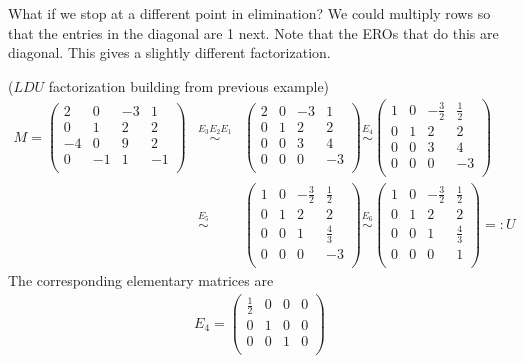 \newpage
What if we stop at a different point in elimination? 
We could multiply rows so that the entries in the diagonal are 1 next. Note that the EROs that do this are diagonal. This gives a slightly different factorization.
\begin{example} \label{factorizes}($LDU$ factorization building from previous example)
\begin{eqnarray*}
M=
\begin{pmatrix}
2&0&-3&1\\
0&1&2&2\\
-4&0&9&2\\
0&-1&1&-1\\
\end{pmatrix}
&\stackrel{E_3E_2E_1}{\sim}&
\begin{pmatrix}
2&0&-3&1\\
0&1&2&2\\
0&0&3&4\\
0&0&0&-3\\
\end{pmatrix}
\stackrel{E_4}{\sim}
\begin{pmatrix}
1&0&-\frac{3}{2}&\frac{1}{2}\\
0&1&2&2\\
0&0&3&4\\
0&0&0&-3\\
\end{pmatrix}
\\[2mm]
&\stackrel{E_5}{\sim}&
\begin{pmatrix}
1&0&-\frac{3}{2}&\frac{1}{2}\\
0&1&2&2\\
0&0&1&\frac43\\
0&0&0&-3\\
\end{pmatrix}
\stackrel{E_6}{\sim}
\begin{pmatrix}
1&0&-\frac{3}{2}&\frac{1}{2}\\
0&1&2&2\\
0&0&1&\frac43\\
0&0&0&1\\
\end{pmatrix}
=:U
\end{eqnarray*}
The corresponding elementary matrices are
\begin{equation*}
\begin{aligned}
E_4=
\begin{pmatrix}
\frac12&0&0&0\\
0&1&0&0\\
0&0&1&0\\

\end{pmatrix}
\end{aligned}
\end{equation*}
\end{example}
